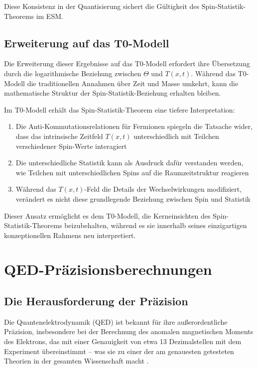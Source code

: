 \documentclass[12pt,a4paper]{article}
\newcommand{\Tfieldt}{T(x,t)}
\begin{document}
	Diese Konsistenz in der Quantisierung sichert die Gültigkeit des Spin-Statistik-Theorems im ESM.
	
	\subsection{Erweiterung auf das T0-Modell}
	\label{subsec:t0_extension}
	
	Die Erweiterung dieser Ergebnisse auf das T0-Modell erfordert ihre Übersetzung durch die logarithmische Beziehung zwischen $\Theta$ und $\Tfieldt$. Während das T0-Modell die traditionellen Annahmen über Zeit und Masse umkehrt, kann die mathematische Struktur der Spin-Statistik-Beziehung erhalten bleiben.
	
	Im T0-Modell erhält das Spin-Statistik-Theorem eine tiefere Interpretation:
	
	\begin{enumerate}
		\item Die Anti-Kommutationsrelationen für Fermionen spiegeln die Tatsache wider, dass das intrinsische Zeitfeld $\Tfieldt$ unterschiedlich mit Teilchen verschiedener Spin-Werte interagiert
		\item Die unterschiedliche Statistik kann als Ausdruck dafür verstanden werden, wie Teilchen mit unterschiedlichen Spins auf die Raumzeitstruktur reagieren
		\item Während das $\Tfieldt$-Feld die Details der Wechselwirkungen modifiziert, verändert es nicht diese grundlegende Beziehung zwischen Spin und Statistik
	\end{enumerate}
	
	Dieser Ansatz ermöglicht es dem T0-Modell, die Kerneinsichten des Spin-Statistik-Theorems beizubehalten, während es sie innerhalb seines einzigartigen konzeptionellen Rahmens neu interpretiert.
	
	\section{QED-Präzisionsberechnungen}
	\label{sec:qed_calculations}
	
	\subsection{Die Herausforderung der Präzision}
	\label{subsec:precision_challenge}
	
	Die Quantenelektrodynamik (QED) ist bekannt für ihre außerordentliche Präzision, insbesondere bei der Berechnung des anomalen magnetischen Moments des Elektrons, das mit einer Genauigkeit von etwa 13 Dezimalstellen mit dem Experiment übereinstimmt – was sie zu einer der am genauesten getesteten Theorien in der gesamten Wissenschaft macht \cite{Hanneke2008}.
	
\end{document}
